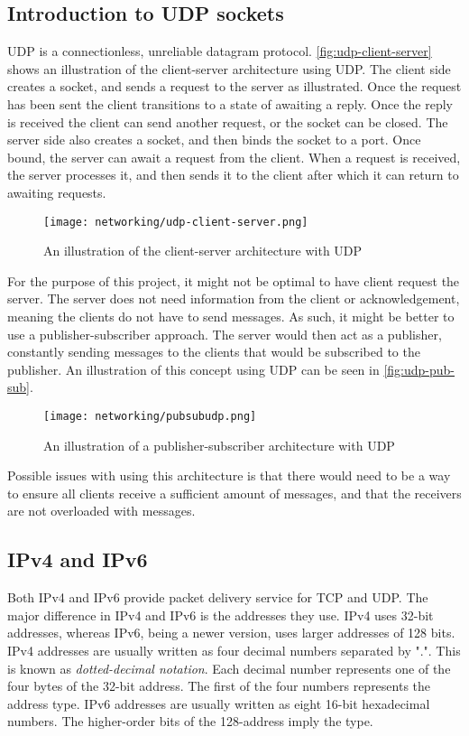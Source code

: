 \subsection{Introduction to UDP sockets}
UDP is a connectionless, unreliable datagram protocol.
\autoref{fig:udp-client-server} shows an illustration of the client-server architecture using UDP.
The client side creates a socket, and sends a request to the server as illustrated.
Once the request has been sent the client transitions to a state of awaiting a reply.
Once the reply is received the client can send another request, or the socket can be closed. 
The server side also creates a socket, and then binds the socket to a port.
Once bound, the server can await a request from the client.
When a request is received, the server processes it, and then sends it to the client after which it can return to awaiting requests.
\begin{figure}[H]
    \centering
    \texttt{[image: networking/udp-client-server.png]}
    \caption{An illustration of the client-server architecture with UDP}
    \label{fig:udp-client-server}
\end{figure}
For the purpose of this project, it might not be optimal to have client request the server.
The server does not need information from the client or acknowledgement, meaning the clients do not have to send messages.
As such, it might be better to use a publisher-subscriber approach.
The server would then act as a publisher, constantly sending messages to the clients that would be subscribed to the publisher.
An illustration of this concept using UDP can be seen in \autoref{fig:udp-pub-sub}.
\begin{figure}[H]
    \centering
    \texttt{[image: networking/pubsubudp.png]}
    \caption{An illustration of a publisher-subscriber architecture with UDP}
    \label{fig:udp-pub-sub}
\end{figure}
Possible issues with using this architecture is that there would need to be a way to ensure all clients receive a sufficient amount of messages, and that the receivers are not overloaded with messages.

\subsection{IPv4 and IPv6}
Both IPv4 and IPv6 provide packet delivery service for TCP and UDP.
The major difference in IPv4 and IPv6 is the addresses they use.
IPv4 uses 32-bit addresses, whereas IPv6, being a newer version, uses larger addresses of 128 bits\cite{socketnetworking}.
IPv4 addresses are usually written as four decimal numbers separated by ".".
This is known as \textit{dotted-decimal notation}.
Each decimal number represents one of the four bytes of the 32-bit address.
The first of the four numbers represents the address type.
IPv6 addresses are usually written as eight 16-bit hexadecimal numbers\cite{socketnetworking}.
The higher-order bits of the 128-address imply the type.

